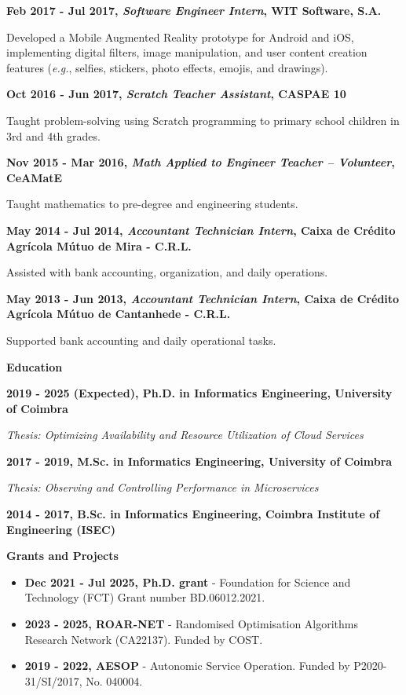 \documentclass[a4paper,9pt]{memoir}
\newcommand{\Sep}{\vspace{1em}} %
\newcommand{\SmallSep}{\vspace{0.5em}} %
\newcommand{\CVSection}[1]{ %
    {\Large\textbf{#1}}\par
    \SmallSep %
}
\newcommand{\CVItem}[2]{ %
    \textbf{\color{RoyalBlue} #1}\par
    #2
    \SmallSep %
}
\begin{document}
\CVItem{Feb 2017 - Jul 2017, \textit{Software Engineer Intern}, WIT Software, S.A.}{
    Developed a Mobile Augmented Reality prototype for Android and iOS, implementing digital filters, image manipulation, and user content creation features (\textit{e.g.}, selfies, stickers, photo effects, emojis, and drawings).

}

\CVItem{Oct 2016 - Jun 2017, \textit{Scratch Teacher Assistant}, CASPAE 10}{
    Taught problem-solving using Scratch programming to primary school children in 3rd and 4th grades.
}

\CVItem{Nov 2015 - Mar 2016, \textit{Math Applied to Engineer Teacher -- Volunteer}, CeAMatE}{
    Taught mathematics to pre-degree and engineering students.
}

\CVItem{May 2014 - Jul 2014, \textit{Accountant Technician Intern}, Caixa de Crédito Agrícola Mútuo de Mira - C.R.L.}{
    Assisted with bank accounting, organization, and daily operations.
}

\CVItem{May 2013 - Jun 2013, \textit{Accountant Technician Intern}, Caixa de Crédito Agrícola Mútuo de Cantanhede - C.R.L.}{
    Supported bank accounting and daily operational tasks.
}

\Sep

\CVSection{Education}

\CVItem{2019 - 2025 (Expected), Ph.D. in Informatics Engineering, University of Coimbra}{
\emph{Thesis: Optimizing Availability and Resource Utilization of Cloud Services}
}

\CVItem{2017 - 2019, M.Sc. in Informatics Engineering, University of Coimbra}{\emph{Thesis: Observing and Controlling Performance in Microservices}}

\CVItem{2014 - 2017, B.Sc. in Informatics Engineering, Coimbra Institute of Engineering (ISEC)}

\Sep

\CVSection{Grants and Projects}

\begin{itemize}[leftmargin=*]
    \item \textbf{Dec 2021 - Jul 2025, Ph.D. grant} - Foundation for Science and Technology (FCT) Grant number BD.06012.2021.
    \item \textbf{2023 - 2025, ROAR-NET} - Randomised Optimisation Algorithms Research Network (CA22137). Funded by COST.
    \item \textbf{2019 - 2022, AESOP} - Autonomic Service Operation. Funded by P2020-31/SI/2017, No. 040004.
\end{itemize}
\end{document}
